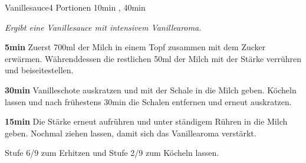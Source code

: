 \documentclass[../recipe-collections/cooking.tex]{subfiles}
\begin{document}
\begin{recipe}{Vanillesauce}{4 Portionen }{10min , 40min }

  \freeform{}\textit{Ergibt eine Vanillesauce mit intensivem Vanillearoma.}


  \textbf{5min}
  Zuerst 700ml der Milch in einem Topf zusammen mit dem Zucker erwärmen.
  Währenddessen die restlichen 50ml der Milch mit der Stärke verrühren und beiseitestellen.


  \textbf{30min}
  Vanilleschote auskratzen und mit der Schale in die Milch geben.
  Köcheln lassen und nach frühestens 30min die Schalen entfernen und erneut auskratzen.

  \newstep{}\textbf{15min}
  Die Stärke erneut aufrühren und unter ständigem Rühren in die Milch geben.
  Nochmal ziehen lassen, damit sich das Vanillearoma verstärkt.

  \freeform{}\hrulefill{}

  \freeform{}
  Stufe 6/9 zum Erhitzen und Stufe 2/9 zum Köcheln lassen.

\end{recipe}
\end{document}
